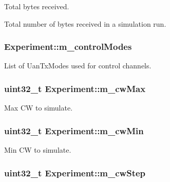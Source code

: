 Total bytes received. 

Total number of bytes received in a simulation run. 
\subsubsection[{\texorpdfstring{m\+\_\+control\+Modes}{m_controlModes}}]{ Experiment\+::m\+\_\+control\+Modes}\hypertarget{classExperiment_aba2da123b31bc2ceb2bc5a0470cc8d31}{}\label{classExperiment_aba2da123b31bc2ceb2bc5a0470cc8d31}


List of Uan\+Tx\+Modes used for control channels. 

\subsubsection[{\texorpdfstring{m\+\_\+cw\+Max}{m_cwMax}}]{\setlength{\rightskip}{0pt plus 5cm}uint32\+\_\+t Experiment\+::m\+\_\+cw\+Max}\hypertarget{classExperiment_a3be9291afcc8b97db510b56314701946}{}\label{classExperiment_a3be9291afcc8b97db510b56314701946}


Max CW to simulate. 

\subsubsection[{\texorpdfstring{m\+\_\+cw\+Min}{m_cwMin}}]{\setlength{\rightskip}{0pt plus 5cm}uint32\+\_\+t Experiment\+::m\+\_\+cw\+Min}\hypertarget{classExperiment_a2dbf3ad2a9b3a535c8bb9bb128e47ad3}{}\label{classExperiment_a2dbf3ad2a9b3a535c8bb9bb128e47ad3}


Min CW to simulate. 

\subsubsection[{\texorpdfstring{m\+\_\+cw\+Step}{m_cwStep}}]{\setlength{\rightskip}{0pt plus 5cm}uint32\+\_\+t Experiment\+::m\+\_\+cw\+Step}\hypertarget{classExperiment_aef4f5d42255d8ebf188b6d760eb7992b}{}\label{classExperiment_aef4f5d42255d8ebf188b6d760eb7992b}


